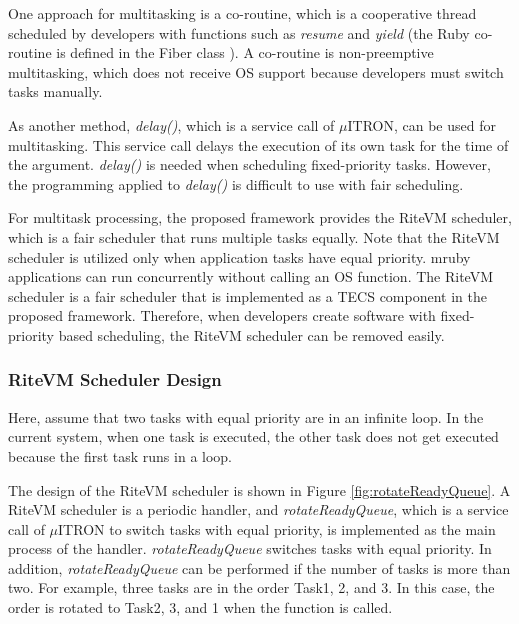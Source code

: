 \documentclass[conference]{IEEEtran/IEEEtran/IEEEtran}
\begin{document}
One approach for multitasking is a co-routine, which is a cooperative thread scheduled by developers with functions such as {\it resume} and {\it yield} (the Ruby co-routine is defined in the Fiber class \cite{url:co-routine}).
A co-routine is non-preemptive multitasking, which does not receive OS support because developers must switch tasks manually.

As another method, {\it delay()}, which is a service call of $\mu$ITRON, can be used for multitasking.
This service call delays the execution of its own task for the time of the argument.
{\it delay()} is needed when scheduling fixed-priority tasks.
However, the programming applied to {\it delay()} is difficult to use with fair scheduling.

For multitask processing, the proposed framework provides the RiteVM scheduler, which is a fair scheduler that runs multiple tasks equally.
Note that the RiteVM scheduler is utilized only when application tasks have equal priority.
mruby applications can run concurrently without calling an OS function.
The RiteVM scheduler is a fair scheduler that is implemented as a TECS component in the proposed framework.
Therefore, when developers create software with fixed-priority based scheduling, the RiteVM scheduler can be removed easily.


\subsubsection{RiteVM Scheduler Design}
Here, assume that two tasks with equal priority are in an infinite loop.
In the current system, when one task is executed, the other task does not get executed because the first task runs in a loop.

The design of the RiteVM scheduler is shown in Figure \ref{fig:rotateReadyQueue}. 
A RiteVM scheduler is a periodic handler, and {\it rotateReadyQueue}, which is a service call of $\mu$ITRON to switch tasks with equal priority, is implemented as the main process of the handler.
{\it rotateReadyQueue} switches tasks with equal priority.
In addition, {\it rotateReadyQueue} can be performed if the number of tasks is more than two.
For example, three tasks are in the order Task1, 2, and 3.
In this case, the order is rotated to Task2, 3, and 1 when the function is called.
\end{document}
